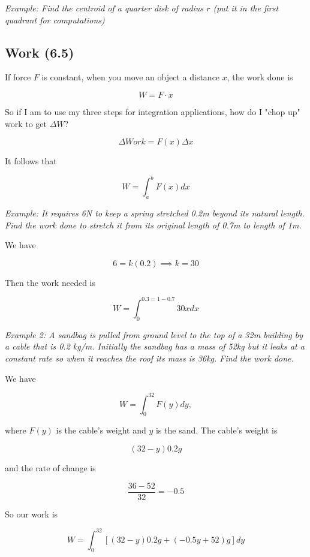         \color{blue} \textit{Example: Find the centroid of a quarter disk of radius $r$ (put it in the first quadrant for computations)} \color{black}

    \subsection{Work (6.5)}

        If force $F$ is constant, when you move an object a distance $x$, the work done is

        \[
            W = F \cdot x
        \]

        So if I am to use my three steps for integration applications, how do I "chop up" work to get $\Delta W$?

        \[
            \Delta Work = F(x) \Delta x
        \]

        It follows that

        \[
            W   = \int_a^b F(x)dx
        \]

        \color{blue} \textit{Example: It requires 6N to keep a spring stretched 0.2m beyond its natural length. Find the work done to stretch it from its original length of 0.7m to length of 1m.} \color{black}

        We have

        \[
            6 = k(0.2) \implies k = 30
        \]

        Then the work needed is

        \[
            W = \int_0^{0.3=1-0.7} 30xdx
        \]

        \color{blue} \textit{Example 2: A sandbag is pulled from ground level to the top of a 32m building by a cable that is 0.2 kg/m. Initially the sandbag has a mass of 52kg but it leaks at a constant rate so when it
        reaches the roof its mass is 36kg. Find the work done.} \color{black}

        We have

        \[
            W = \int_0^{32} F(y) dy,
        \]

        where $F(y)$ is the cable's weight and $y$ is the sand. The cable's weight is

        \[
            (32-y)0.2g
        \]

        and the rate of change is

        \[
            \frac{36-52}{32}=-0.5
        \]

        So our work is

        \[
            W = \int_0^{32} \left[(32-y)0.2g+(-0.5y+52)g\right]dy
        \]

